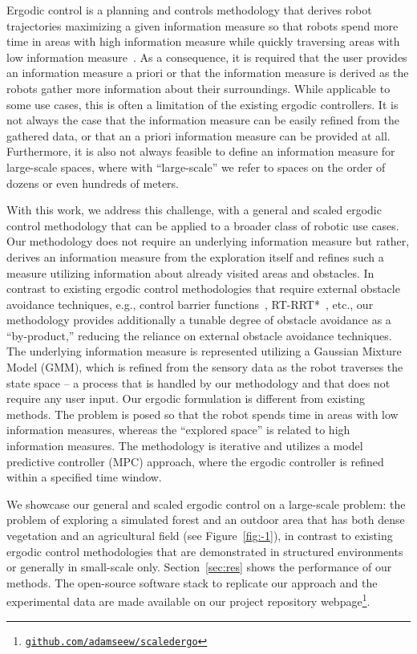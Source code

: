\documentclass[letterpaper,10pt,conference,twoside]{IEEEtran}
\theoremstyle{definition}
\begin{document}
Ergodic control is a planning and controls methodology that derives robot trajectories maximizing a given information measure so that robots spend more time in areas with high information measure while quickly traversing areas with low information measure~\cite{mathew2011metrics,abraham2017ergodic,miller2013trajectory}. As a consequence, it is required that the user provides an information measure a priori or that the information measure is derived as the robots gather more information about their surroundings. While applicable to some use cases, this is often a limitation of the existing ergodic controllers. It is not always the case that the information measure can be easily refined from the gathered data, or that an a priori information measure can be provided at all. Furthermore, it is also not always feasible to define an information measure for large-scale spaces, %
where with ``large-scale'' we refer to spaces on the order of dozens or even hundreds of meters. 

With this work, we address this challenge, with a general and scaled ergodic control methodology that can be applied to a broader class of robotic use cases. Our methodology does not require an underlying information measure but rather, derives an information measure from the exploration itself and refines such a measure utilizing information about already visited areas and obstacles. %
In contrast to existing ergodic control methodologies that require external obstacle avoidance techniques, e.g., control barrier functions~\cite{lerch2023safety}, RT-RRT*~\cite{prabhakar2020ergodic}, etc., our methodology provides additionally a tunable degree of obstacle avoidance as a ``by-product,'' reducing the reliance on external obstacle avoidance techniques.  
%
The underlying information measure is represented utilizing a Gaussian Mixture Model (GMM), which is refined from the sensory data as the robot traverses the state space -- a process that is handled by our methodology and that does not require any user input. Our ergodic formulation is different from existing methods. The problem is posed so that the robot spends time in areas with low information measures, whereas the ``explored space'' is related to high information measures. The methodology is iterative and utilizes a model predictive controller (MPC) approach, where the ergodic controller is refined within a specified time window.

\IEEEpubidadjcol
We showcase our general and scaled ergodic control on a large-scale problem: the problem of exploring a simulated forest and an outdoor area that has both dense vegetation and an agricultural field (see Figure~\ref{fig:-1}), in contrast to existing ergodic control methodologies that are demonstrated in structured environments or generally in small-scale only. Section~\ref{sec:res} shows the performance of our methods. The open-source software stack to replicate our approach and the experimental data are made available on our project repository webpage\footnote{\href{https://github.com/adamseew/scaledergo}{\tt github.com/adamseew/scaledergo}}.
\end{document}
